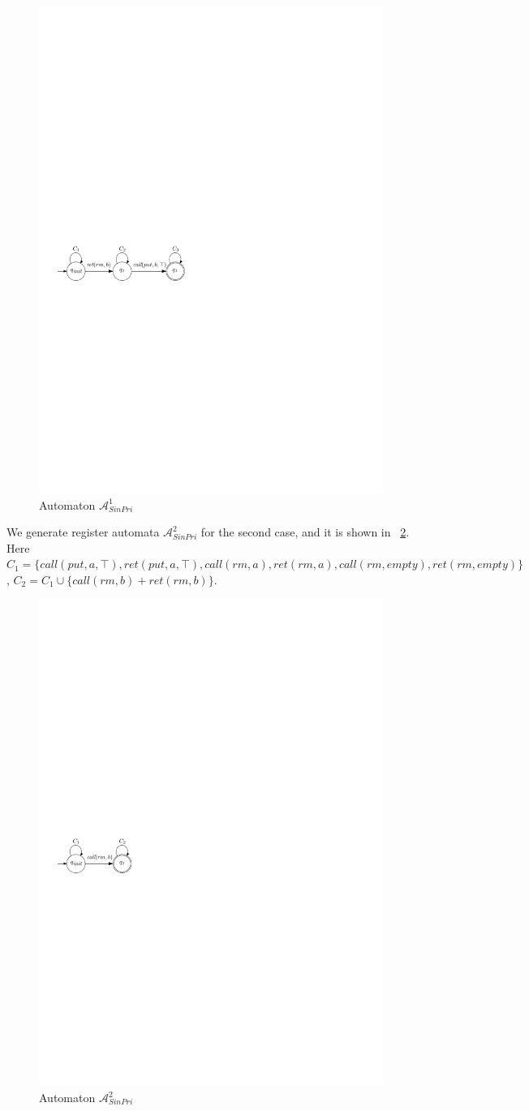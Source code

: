 \begin{figure}[htbp]
  \centering
  \includegraphics[width=0.5 \textwidth]{figures/PIC_AUTO_FIFO_1.pdf}
  \caption{Automaton $\mathcal{A}_{\textit{SinPri}}^1$}
  \label{fig:automata for FIFO-1 in appendix}
\end{figure}


We generate register automata $\mathcal{A}_{\textit{SinPri}}^2$ for the second case, and it is shown in \figurename~\ref{fig:automata for FIFO-2}. Here $C_1 = \{ \textit{call}(\textit{put},a,\top),\textit{ret}(\textit{put},a,\top), \textit{call}(\textit{rm},a),\textit{ret}(\textit{rm},a),\textit{call}(\textit{rm},\textit{empty}),\textit{ret}(\textit{rm},\textit{empty}) \}$, $C_2 = C_1 \cup \{ \textit{call}(\textit{rm},b) + \textit{ret}(\textit{rm},b) \}$.


\begin{figure}[htbp]
  \centering
  \includegraphics[width=0.3 \textwidth]{figures/PIC_AUTO_FIFO_2.pdf}
  \caption{Automaton $\mathcal{A}_{\textit{SinPri}}^2$}
  \label{fig:automata for FIFO-2}
\end{figure}

